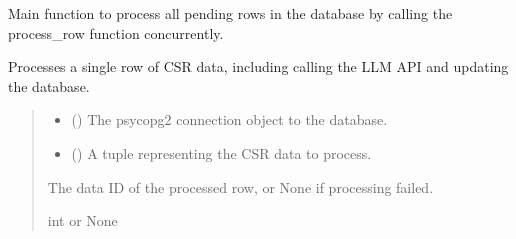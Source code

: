 \documentclass[letterpaper,10pt,english]{sphinxmanual}
\begin{document}

\begin{fulllineitems}
\label{\detokenize{modules.data_storage:modules.data_storage.llm_standardize.main}}
\pysigstartsignatures
\pysiglinewithargsret
{}
{}
{}
\pysigstopsignatures
\sphinxAtStartPar
Main function to process all pending rows in the database by calling the process\_row function concurrently.

\end{fulllineitems}


\begin{fulllineitems}
\label{\detokenize{modules.data_storage:modules.data_storage.llm_standardize.process_row}}
\pysigstartsignatures
\pysiglinewithargsret
{}
{\sphinxparamcomma {}}
{}
\pysigstopsignatures
\sphinxAtStartPar
Processes a single row of CSR data, including calling the LLM API and updating the database.
\begin{quote}\begin{description}
\begin{itemize}
\item {} 
\sphinxAtStartPar
{} () \textendash{} The psycopg2 connection object to the database.

\item {} 
\sphinxAtStartPar
{} () \textendash{} A tuple representing the CSR data to process.

\end{itemize}

\sphinxAtStartPar
The data ID of the processed row, or None if processing failed.

\sphinxAtStartPar
int or None

\end{description}\end{quote}

\end{fulllineitems}
\end{document}
